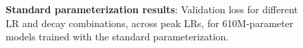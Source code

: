 \begin{figure}
  \centering
  \mbox{}
  \vspace{-4mm}
  \mbox{}
  \caption{\textbf{Standard parameterization results}:
    Validation loss for different LR and decay combinations, across
    peak LRs, for 610M-parameter models trained with the standard
    parameterization.\label{fig:maxlr_sp.curves}}
\end{figure}
